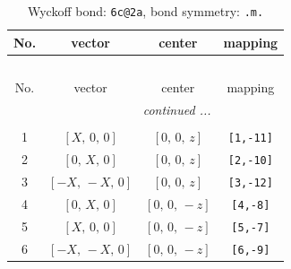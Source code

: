 \documentclass[fleqn,8pt]{jsarticle}
\begin{document}
\renewcommand{\arraystretch}{1.2}
\begin{longtable}{cccc}
\caption{Wyckoff bond: {\tt 6c@2a}, bond symmetry: {\tt .m.}}
 \\
 \hline \hline
No. & vector & center & mapping \\ \hline \endfirsthead

\multicolumn{3}{l}{\tablename\ \thetable{}} \\
 \hline \hline
No. & vector & center & mapping \\ \hline \endhead

 \hline \hline
\multicolumn{3}{r}{\footnotesize\it continued ...} \\ \endfoot

 \hline \hline
\multicolumn{3}{r}{} \\ \endlastfoot

1 & $\left[ X,\, 0,\, 0 \right]$ & $\left[ 0,\, 0,\, z \right]$ & {\tt [1,-11]} \\ \hline
2 & $\left[ 0,\, X,\, 0 \right]$ & $\left[ 0,\, 0,\, z \right]$ & {\tt [2,-10]} \\ \hline
3 & $\left[ - X,\, - X,\, 0 \right]$ & $\left[ 0,\, 0,\, z \right]$ & {\tt [3,-12]} \\ \hline
4 & $\left[ 0,\, X,\, 0 \right]$ & $\left[ 0,\, 0,\, - z \right]$ & {\tt [4,-8]} \\ \hline
5 & $\left[ X,\, 0,\, 0 \right]$ & $\left[ 0,\, 0,\, - z \right]$ & {\tt [5,-7]} \\ \hline
6 & $\left[ - X,\, - X,\, 0 \right]$ & $\left[ 0,\, 0,\, - z \right]$ & {\tt [6,-9]} \\
\end{longtable}
\renewcommand{\arraystretch}{1.2}
\end{document}
